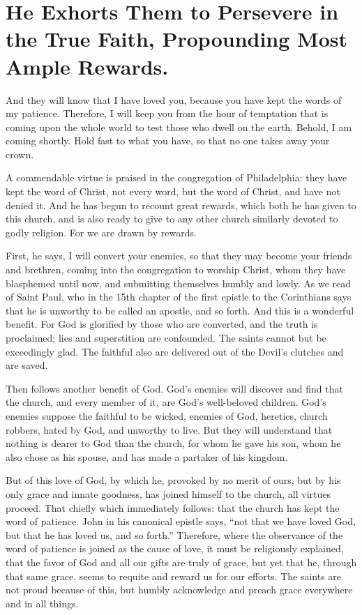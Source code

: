 \chapter[Sermon 18. He Exhorts Them to Persevere in the True Faith, Propounding Most Ample Rewards.]{He Exhorts Them to Persevere in the True Faith, Propounding Most Ample Rewards.}
\label{sermon:018}

And they will know that I have loved you, because you have kept the words of my patience. Therefore, I will keep you from the hour of temptation that is coming upon the whole world to test those who dwell on the earth. Behold, I am coming shortly. Hold fast to what you have, so that no one takes away your crown.

A commendable virtue is praised in the congregation of Philadelphia: they have kept the word of Christ, not every word, but the word of Christ, and have not denied it. And he has begun to recount great rewards, which both he has given to this church, and is also ready to give to any other church similarly devoted to godly religion. For we are drawn by rewards.

First, he says, I will convert your enemies, so that they may become your friends and brethren, coming into the congregation to worship Christ, whom they have blasphemed until now, and submitting themselves humbly and lowly. As we read of Saint Paul, who in the 15th chapter of the first epistle to the Corinthians says that he is unworthy to be called an apostle, and so forth. And this is a wonderful benefit. For God is glorified by those who are converted, and the truth is proclaimed; lies and superstition are confounded. The saints cannot but be exceedingly glad. The faithful also are delivered out of the Devil’s clutches and are saved.

Then follows another benefit of God. God’s enemies will discover and find that the church, and every member of it, are God’s well-beloved children. God’s enemies suppose the faithful to be wicked, enemies of God, heretics, church robbers, hated by God, and unworthy to live. But they will understand that nothing is dearer to God than the church, for whom he gave his son, whom he also chose as his spouse, and has made a partaker of his kingdom.

But of this love of God, by which he, provoked by no merit of ours, but by his only grace and innate goodness, has joined himself to the church, all virtues proceed. That chiefly which immediately follows: that the church has kept the word of patience. John in his canonical epistle says, “not that we have loved God, but that he has loved us, and so forth.” Therefore, where the observance of the word of patience is joined as the cause of love, it must be religiously explained, that the favor of God and all our gifts are truly of grace, but yet that he, through that same grace, seems to requite and reward us for our efforts. The saints are not proud because of this, but humbly acknowledge and preach grace everywhere and in all things.

